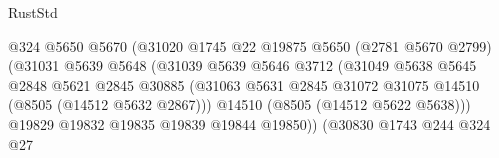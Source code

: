 \begin{lexlean}{RustStd}
\begin{coremodule}
                                                @324
                                                @5650
                                                @5670
                                                (@31020
                                                  @1745
                                                  @22
                                                  @19875
                                                  @5650
                                                  (@2781 @5670 @2799)
                                                  (@31031
                                                    @5639
                                                    @5648
                                                    (@31039
                                                      @5639
                                                      @5646
                                                      @3712
                                                      (@31049
                                                        @5638
                                                        @5645
                                                        @2848
                                                        @5621
                                                        @2845
                                                        @30885
                                                        (@31063
                                                          @5631
                                                          @2845
                                                          @31072
                                                          @31075
                                                          @14510
                                                          (@8505 (@14512 @5632 @2867)))
                                                        @14510
                                                        (@8505 (@14512 @5622 @5638)))
                                                      @19829
                                                      @19832
                                                      @19835
                                                      @19839
                                                      @19844
                                                      @19850))
                                                  (@30830
                                                    @1743
                                                    @244
                                                    @324
                                                    @27

\end{coremodule}
\end{lexlean}
